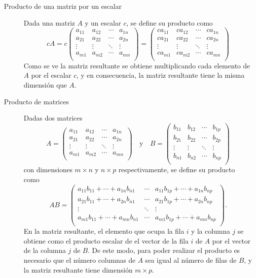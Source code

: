\documentclass[a4paper]{article}
\begin{document}
\begin{description}
\item [Producto de una matriz por un escalar] Dada una matriz $A$ y un escalar $c$, se define su producto como  
\[cA=c
\left(
\begin{array}{cccc}
 a_{11} & a_{12} & \cdots & a_{1n} \\
 a_{21} & a_{22} & \cdots & a_{2n} \\
 \vdots & \vdots & \ddots & \vdots \\
 a_{m1} & a_{m2} & \cdots & a_{mn} \\
\end{array}
\right)
=
\left(
\begin{array}{cccc}
 ca_{11} & ca_{12} & \cdots & ca_{1n} \\
 ca_{21} & ca_{22} & \cdots & ca_{2n} \\
 \vdots & \vdots & \ddots & \vdots \\
 ca_{m1} & ca_{m2} & \cdots & ca_{mn} \\
\end{array}
\right)
\]
Como se ve la matriz resultante se obtiene multiplicando cada elemento de $A$ por el escalar $c$, y en consecuencia, la matriz resultante tiene la misma dimensión que $A$.


\item [Producto de matrices]
Dadas dos matrices
\[A=
\left(
\begin{array}{cccc}
 a_{11} & a_{12} & \cdots & a_{1n} \\
 a_{21} & a_{22} & \cdots & a_{2n} \\
 \vdots & \vdots & \ddots & \vdots \\
 a_{m1} & a_{m2} & \cdots & a_{mn} \\
\end{array}
\right)
\quad \textrm{y} \quad
B=\left(
\begin{array}{cccc}
 b_{11} & b_{12} & \cdots & b_{1p} \\
 b_{21} & b_{22} & \cdots & b_{2p} \\
 \vdots & \vdots & \ddots & \vdots \\
 b_{n1} & b_{n2} & \cdots & b_{np} \\
\end{array}
\right)
\]
con dimensiones $m\times n$ y $n\times p$ respectivamente, se define su producto como
\[
AB=
\left(
\begin{array}{ccc}
 a_{11}b_{11}+\cdots+a_{1n}b_{n1} & \cdots & a_{11}b_{1p}+\cdots+a_{1n}b_{np} \\
 a_{21}b_{11}+\cdots+a_{2n}b_{n1} & \cdots & a_{21}b_{1p}+\cdots+a_{2n}b_{np}\\
 \vdots & \ddots & \vdots \\
 a_{m1}b_{11}+\cdots+a_{mn}b_{n1} & \cdots & a_{m1}b_{1p}+\cdots+a_{mn}b_{np} \\
\end{array}
\right).
\]
En la matriz resultante, el elemento que ocupa la fila $i$ y la columna $j$ se obtiene como el producto escalar de el vector de la fila $i$ de $A$ por el vector de la columna $j$ de $B$. De este modo, para poder realizar el producto es necesario que el número columnas de $A$ sea igual al número de filas de $B$, y la matriz resultante tiene dimensión $m\times p$. 


\end{description}
\end{document}
